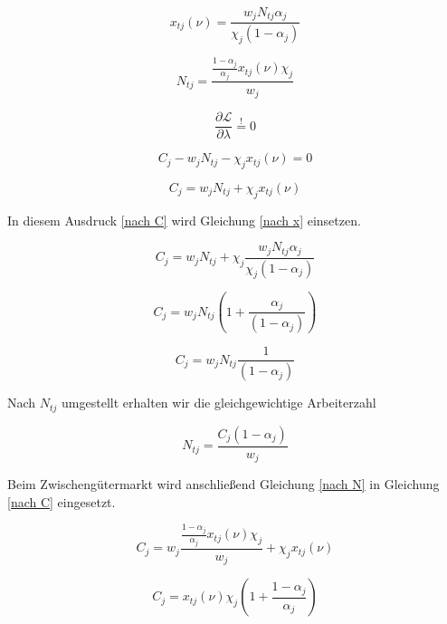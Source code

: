  
\begin{equation}
x_{tj}(\nu)=\frac{w_jN_{tj}\alpha_j}{\chi_j(1-\alpha_j)}\label{nach x}
\end{equation}


\begin{equation}
N_{tj}=\frac{\frac{1-\alpha_j}{\alpha_j}x_{tj}(\nu)\chi_j}{w_j} \label{nach N}
\end{equation}


\begin{equation*}
\frac{\partial \mathcal{L}}{\partial \lambda}\overset{!}{=} 0
\end{equation*}


\begin{equation*}
C_j-w_jN_{tj}-\chi_jx_{tj}(\nu)=0
\end{equation*}


\begin{equation}
C_j=w_jN_{tj}+\chi_jx_{tj}(\nu) \label{nach C}
\end{equation}


In diesem Ausdruck \eqref{nach C} wird Gleichung \eqref{nach x} einsetzen.


\begin{equation*}
C_j=w_jN_{tj}+\chi_j\frac{w_jN_{tj}\alpha_j}{\chi_j(1-\alpha_j)}
\end{equation*}


\begin{equation*}
C_j=w_jN_{tj}\left(1+\frac{\alpha_j}{(1-\alpha_j)}\right)
\end{equation*}


\begin{equation*}
C_j=w_jN_{tj}\frac{1}{(1-\alpha_j)}
\end{equation*}


Nach $N_{tj}$ umgestellt erhalten wir die gleichgewichtige Arbeiterzahl


\begin{equation}
\boxed{N_{tj}=\frac{C_j(1-\alpha_j)}{w_j}}\label{GGArbeiter}
\end{equation}


Beim Zwischengütermarkt wird anschlie{\ss}end Gleichung \eqref{nach N} in Gleichung \eqref{nach C} eingesetzt.


\begin{equation*}
C_j=w_j\frac{\frac{1-\alpha_j}{\alpha_j}x_{tj}(\nu)\chi_j}{w_j}+\chi_jx_{tj}(\nu)
\end{equation*}


\begin{equation*}
C_j=x_{tj}(\nu)\chi_j\left(1+\frac{1-\alpha_j}{\alpha_j}\right)
\end{equation*}


